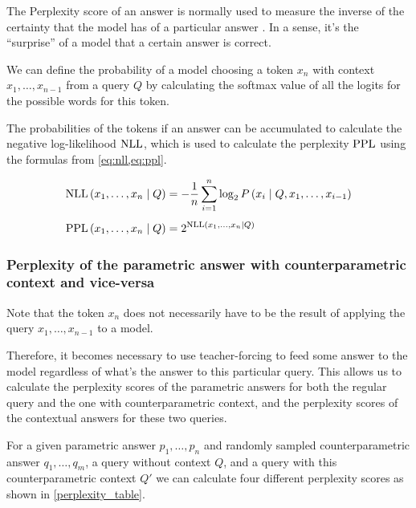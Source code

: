 The Perplexity score of an answer is normally used to measure the inverse of the certainty that the model has of a particular answer \citep{fewshotlearners,retro}.
In a sense, it's the ``surprise'' of a model that a certain answer is correct.

We can define the probability of a model choosing a token $x_n$ with context $x_1, \dots, x_{n - 1}$ from a query $Q$ by calculating the softmax value of all the logits for the possible words for this token.

The probabilities of the tokens if an answer can be accumulated to calculate the negative log-likelihood $\text{NLL}$, which is used to calculate the perplexity $\text{PPL}$ using the formulas from \cref{eq:nll,eq:ppl}.

\begin{align}
	\text{NLL} \left( x_1, \dots, x_n \mid Q \right) &= - \frac{1}{n} \sum^n_{i = 1} \log_2 P \left( x_i \mid Q, x_1, \dots, x_{i - 1} \right) \label{eq:nll} \\[1ex]
	\text{PPL} \left( x_1, \dots, x_n \mid Q \right) &= {2 ^ {\text{NLL} \left( x_1, \dots, x_n \mid Q \right)}} \label{eq:ppl}
\end{align}


\subsubsection{Perplexity of the parametric answer with counterparametric context and vice-versa}

Note that the token $x_n$ does not necessarily have to be the result of applying the query $x_1, \dots, x_{n - 1}$ to a model.

Therefore, it becomes necessary to use teacher-forcing \citep{teacher_forcing} to feed some answer to the model regardless of what's the answer to this particular query. This allows us to calculate the perplexity scores of the parametric answers for both the regular query and the one with counterparametric context, and the perplexity scores of the contextual answers for these two queries.

For a given parametric answer $p_1, \dots, p_n$ and randomly sampled counterparametric answer $q_1, \dots, q_m$, a query without context $Q$, and a query with this counterparametric context $Q'$ we can calculate four different perplexity scores as shown in \cref{perplexity_table}.

